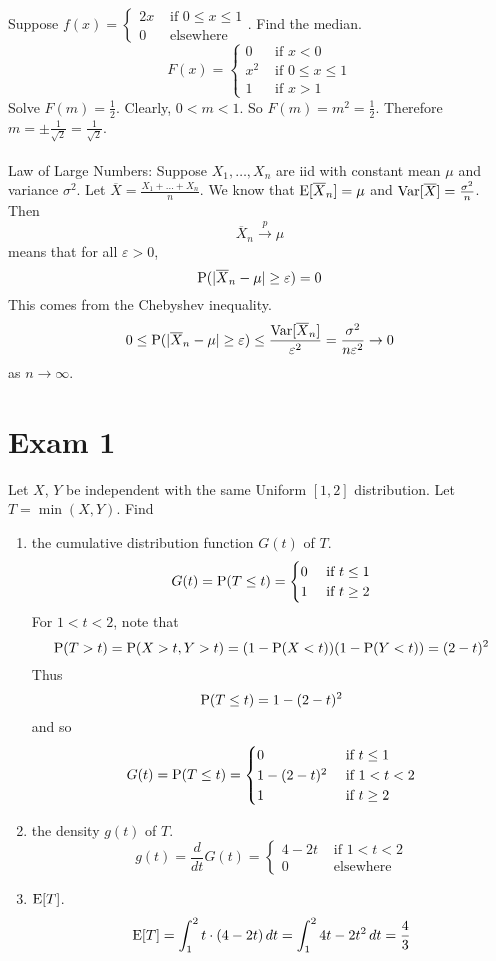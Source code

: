\documentclass[12pt]{article}
\begin{document}
Suppose $f(x) = \begin{cases} 2x &\text{ if } 0 \leq x \leq 1 \\ 0 &\text{ elsewhere } \end{cases} $. Find the median. 
$$ F(x) = \begin{cases} 0 &\text{ if } x < 0 \\ x^2 &\text{ if } 0 \leq x \leq 1 \\ 1 &\text{ if } x > 1 \end{cases} $$ Solve $F(m) = \frac{1}{2}$. Clearly, $0 < m < 1$. So $F(m) = m^2 = \frac{1}{2}$. Therefore $m = \pm \frac{1}{\sqrt{2}} = \frac{1}{\sqrt{2}}$. \\~\\
Law of Large Numbers: Suppose $X_1,\dots,X_n$ are iid with constant mean $\mu$ and variance $\sigma^2$. Let $\overline{X} = \frac{X_1 + \dots + X_n}{n}$. We know that $\mathrm{E}[ \overline{X}_n ] = \mu$ and $\mathrm{Var}[ \overline{X} ] = \frac{\sigma^2}{n}$. Then $$ \overline{X}_n \stackrel{p}{\to} \mu $$ means that for all $\varepsilon > 0$,
$$ \mathrm{P}( |\overline{X}_n - \mu| \geq \varepsilon ) = 0 $$ 
This comes from the Chebyshev inequality. 
$$ 0 \leq \mathrm{P}( |\overline{X}_n - \mu| \geq \varepsilon ) \leq \frac{\mathrm{Var}[ \overline{X}_n ]}{\varepsilon^2} = \frac{\sigma^2}{n\varepsilon^2} \to 0 $$ as $n \to \infty$. 

\section{Exam 1} 
\begin{question} Let $X$, $Y$ be independent with the same Uniform $[1,2]$ distribution. Let $T = \min(X,Y)$. Find \begin{enumerate} 
\item the cumulative distribution function $G(t)$ of $T$.
$$ G(t) = \mathrm{P}( T \leq t ) = \begin{cases} 0 &\text{ if } t \leq 1 \\ 1 &\text{ if } t \geq 2 \end{cases} $$ 
For $1 < t < 2$, note that $$\mathrm{P}( T > t ) = \mathrm{P}( X > t, Y > t ) = (1 - \mathrm{P}( X < t ))(1-\mathrm{P}( Y < t )) = (2-t)^2 $$ 
Thus $$ \mathrm{P}( T \leq t ) = 1 - (2-t)^2$$
and so $$ G(t) = \mathrm{P}( T \leq t ) = \begin{cases} 0 &\text{ if } t \leq 1 \\ 1 - (2-t)^2 &\text{ if } 1 < t < 2 \\ 1 &\text{ if } t \geq 2 \end{cases} $$ 
\item the density $g(t)$ of $T$. 
$$ g(t) = \frac{d}{dt} G(t) = \begin{cases} 4 - 2t &\text{ if } 1 < t < 2 \\ 0 &\text{ elsewhere} \end{cases} $$ 
\item $\mathrm{E}[ T ]$. 
$$ \mathrm{E}[ T ] = \int_1^2 t \cdot (4-2t)\, dt = \int_1^2 4t - 2t^2 \, dt = \frac{4}{3} $$ 
\end{enumerate} \end{question} 
\end{document}
